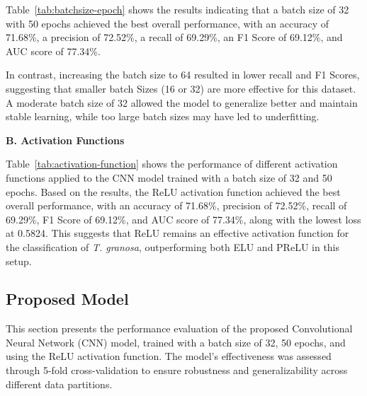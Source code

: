 Table~\ref{tab:batchsize-epoch} shows the results indicating that a batch size of 32 with 50 epochs achieved the best overall performance, with an accuracy of 71.68\%, a precision of 72.52\%, a recall of 69.29\%, an F1 Score of 69.12\%, and AUC score of 77.34\%.

In contrast, increasing the batch size to 64 resulted in lower recall and F1 Scores, suggesting that smaller batch Sizes (16 or 32) are more effective for this dataset. A moderate batch size of 32 allowed the model to generalize better and maintain stable learning, while too large batch sizes may have led to underfitting.

\newpage
\noindent\textbf{B. Activation Functions}

\begin{table}[H]
	\centering
	\caption{Performance metrics for different activation functions (Batch Size: 32, Epochs: 50).}
	\label{tab:activation-function}
\end{table}

Table~\ref{tab:activation-function} shows the performance of different activation functions applied to the CNN model trained with a batch size of 32 and 50 epochs. Based on the results, the ReLU activation function achieved the best overall performance, with an accuracy of 71.68\%, precision of 72.52\%, recall of 69.29\%, F1 Score of 69.12\%, and AUC score of 77.34\%, along with the lowest loss at 0.5824. This suggests that ReLU remains an effective activation function for the classification of \textit{T. granosa}, outperforming both ELU and PReLU in this setup.

\subsection{Proposed Model}
This section presents the performance evaluation of the proposed Convolutional Neural Network (CNN) model, trained with a batch size of 32, 50 epochs, and using the ReLU activation function. The model’s effectiveness was assessed through 5-fold cross-validation to ensure robustness and generalizability across different data partitions. 

